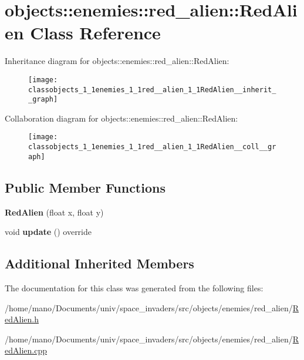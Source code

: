 \hypertarget{classobjects_1_1enemies_1_1red__alien_1_1RedAlien}{}\section{objects\+:\+:enemies\+:\+:red\+\_\+alien\+:\+:Red\+Alien Class Reference}
\label{classobjects_1_1enemies_1_1red__alien_1_1RedAlien}


Inheritance diagram for objects\+:\+:enemies\+:\+:red\+\_\+alien\+:\+:Red\+Alien\+:\nopagebreak
\begin{figure}[H]
\begin{center}
\leavevmode
\texttt{[image: classobjects\_1\_1enemies\_1\_1red\_\_alien\_1\_1RedAlien\_\_inherit\_\_graph]}
\end{center}
\end{figure}


Collaboration diagram for objects\+:\+:enemies\+:\+:red\+\_\+alien\+:\+:Red\+Alien\+:\nopagebreak
\begin{figure}[H]
\begin{center}
\leavevmode
\texttt{[image: classobjects\_1\_1enemies\_1\_1red\_\_alien\_1\_1RedAlien\_\_coll\_\_graph]}
\end{center}
\end{figure}
\subsection*{Public Member Functions}
\begin{DoxyCompactItemize}
\item 
\mbox{\label{classobjects_1_1enemies_1_1red__alien_1_1RedAlien_a481a0056973e547b92509fd4cced6282}}
{\bfseries Red\+Alien} (float x, float y)
\item 
\mbox{\label{classobjects_1_1enemies_1_1red__alien_1_1RedAlien_a29103fc5f6e44ea7b239b57fff8a1e59}}
void {\bfseries update} () override
\end{DoxyCompactItemize}
\subsection*{Additional Inherited Members}


The documentation for this class was generated from the following files\+:\begin{DoxyCompactItemize}
\item 
/home/mano/\+Documents/univ/space\+\_\+invaders/src/objects/enemies/red\+\_\+alien/\hyperlink{RedAlien_8h}{Red\+Alien.\+h}\item
/home/mano/\+Documents/univ/space\+\_\+invaders/src/objects/enemies/red\+\_\+alien/\hyperlink{RedAlien_8cpp}{Red\+Alien.\+cpp}\end{DoxyCompactItemize}
